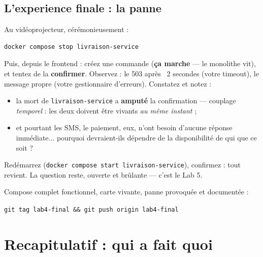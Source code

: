 \documentclass[a4paper,11pt]{article}
\begin{document}
\subsection{L'experience finale : la panne}

Au vidéoprojecteur, cérémonieusement :

\begin{lstlisting}[language=bash]
docker compose stop livraison-service
\end{lstlisting}

Puis, depuis le frontend : créez une commande (\textbf{ça marche} --- le
monolithe vit), et tentez de la \textbf{confirmer}. Observez : le 503
après ~2 secondes (votre timeout), le message propre (votre
gestionnaire d'erreurs). Constatez et notez :

\begin{itemize}[nosep]
  \item la mort de \texttt{livraison-service} a \textbf{amputé} la
        confirmation --- couplage \emph{temporel} : les deux doivent être
        vivants \emph{au même instant} ;
  \item et pourtant les SMS, le paiement, eux, n'ont besoin d'aucune
        réponse immédiate... pourquoi devraient-ils dépendre de la
        disponibilité de qui que ce soit ?
\end{itemize}

Redémarrez (\texttt{docker compose start livraison-service}), confirmez :
tout revient. La question reste, ouverte et brûlante --- c'est le Lab 5.

\begin{tagbox}
Compose complet fonctionnel, carte vivante, panne provoquée et documentée :
\begin{center}
\texttt{git tag lab4-final \&\& git push origin lab4-final}
\end{center}
\end{tagbox}

\section{Recapitulatif : qui a fait quoi}
\end{document}
